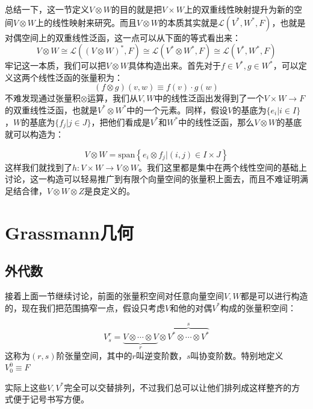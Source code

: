 总结一下，这一节定义$V\otimes W$的目的就是把$V\times W$上的双重线性映射提升为新的空间$V\otimes W$上的线性映射来研究。而且$V\otimes W$的本质其实就是$\mathscr{L}(V^*,W^*,F)$，也就是对偶空间上的双重线性泛函，这一点可以从下面的等式看出来：
\begin{equation}
	V\otimes W\cong \mathscr{L}\left((V\otimes W)^*,F\right)\cong\mathscr{L}\left(V^*\otimes W^*,F\right)\cong\mathscr{L}(V^*,W^*,F)
\end{equation}
牢记这一本质，我们可以把$V\otimes W$具体构造出来。首先对于$f\in V^*,g\in W^*$，可以定义这两个线性泛函的张量积为：
\begin{equation}
	(f\otimes g)(v,w)\equiv f(v)\cdot g(w)
\end{equation}
不难发现通过张量积$\otimes$运算，我们从$V,W$中的线性泛函出发得到了一个$V\times W\to F$的双重线性泛函，也就是$V^*\otimes W^*$中的一个元素。同样，假设$V$的基底为$\{e_i|i\in I\}$，$W$的基底为$\{f_j|j\in J\}$，把他们看成是$V^*$和$W^*$中的线性泛函，那么$V\otimes W$的基底就可以构造为：

\begin{equation}
	V\otimes W=\mathrm{span} \left\{e_i\otimes f_j|(i,j)\in I\times J\right\}
\end{equation}
这样我们就找到了$h:V\times W\to V\otimes W$。我们这里都是集中在两个线性空间的基础上讨论，这一构造可以轻易推广到有限个向量空间的张量积上面去，而且不难证明满足结合律，$V\otimes W\otimes Z$是良定义的。

\section{Grassmann几何}
\subsection{外代数}
接着上面一节继续讨论，前面的张量积空间对任意向量空间$V,W$都是可以进行构造的，现在我们把范围搞窄一点，假设只考虑$V$和他的对偶$V^*$构成的张量积空间：
\begin{definition}[$(r,s)$阶张量空间]
	\begin{equation}
	V^r_s=\underbrace{V\otimes\cdots \otimes V}_{r}\otimes \overbrace{V^*\otimes\cdots \otimes V^*}^{s}
\end{equation}
这称为$(r,s)$阶张量空间，其中的$r$叫逆变阶数，$s$叫协变阶数。特别地定义$V^0_0\equiv F$
\end{definition}
\begin{remark}
	实际上这些$V,V^*$完全可以交替排列，不过我们总可以让他们排列成这样整齐的方式便于记号书写方便。
\end{remark}

